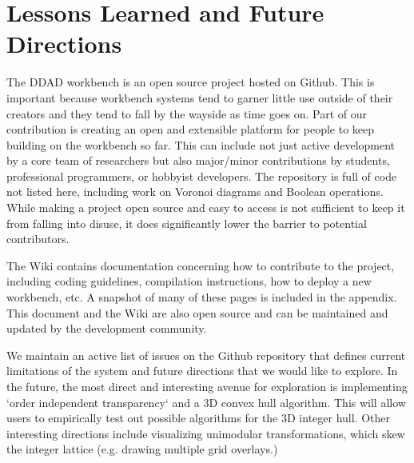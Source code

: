 \FloatBarrier
\section{Lessons Learned and Future Directions} 
\label{sec:lessons-learned}

The DDAD workbench is an open source project hosted on Github. This is important
because workbench systems tend to garner little use outside of their creators
and they tend to fall by the wayside as time goes on. Part of our contribution
is creating an open and extensible platform for people to keep building on the
workbench so far. This can include not just active development by a core team of
researchers but also major/minor contributions by students, professional
programmers, or hobbyist developers. The repository is full of code not
listed here, including work on Voronoi diagrams and Boolean operations. While
making a project open source and easy to access is not sufficient to keep it
from falling into disuse, it does significantly lower the barrier to potential
contributors.

The Wiki contains documentation concerning how to contribute to the project,
including coding guidelines, compilation instructions, how to deploy
a new workbench, etc. A snapshot of many of these pages is included in the
appendix. This document and the Wiki are also open source and can be maintained
and updated by the development community.

We maintain an active list of issues on the Github repository that defines
current limitations of the system and future directions that we would like to
explore. In the future, the most direct and interesting avenue for exploration
is implementing `order independent transparency` and a 3D convex hull algorithm.
This will allow users to empirically test out possible algorithms for the 3D
integer hull. Other interesting directions include visualizing unimodular
transformations, which skew the integer lattice (e.g. drawing multiple grid
overlays.)


% 	
